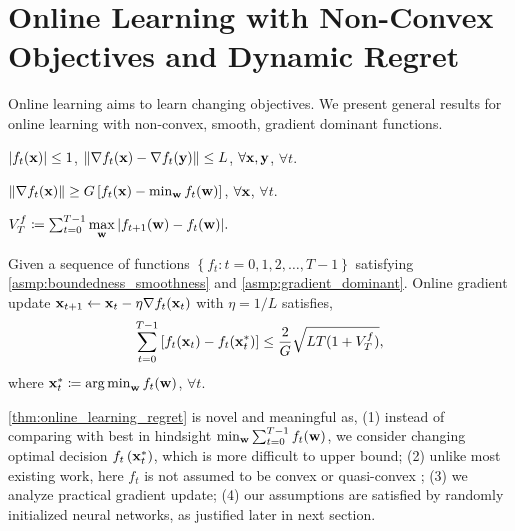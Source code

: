\section{Online Learning with Non-Convex Objectives and Dynamic Regret}

Online learning aims to learn changing objectives. We present general results for online learning with non-convex, smooth, gradient dominant functions.

\begin{asmp}
\label{asmp:boundedness_smoothness}
$\left| f_t({\mathbf{x}}) \right| \le 1$, $\left\| \nabla f_t({\mathbf{x}} ) - \nabla f_t({\mathbf{y}}) \right\| \le L $, $\forall {\mathbf{x}}, {\mathbf{y}}$, $\forall t$.
\end{asmp}

\begin{asmp}
\label{asmp:gradient_dominant}
$\left\| \nabla f_t({\mathbf{x}}) \right\| \ge G \left[ f_t({\mathbf{x}}) - \min_{{\mathbf{w}}}{ f_t({\mathbf{w}} )} \right]$, $\forall {\mathbf{x}}$, $\forall t$.
\end{asmp}

\begin{defi}
\label{defi:function_variation}
$V_{T}^{f} \coloneqq \sum_{t=0}^{T-1}{\max\limits_{{\mathbf{w}}}{\left| f_{t+1}({\mathbf{w}}) - f_{t}({\mathbf{w}}) \right| } }.$
\end{defi}

\begin{thm}
\label{thm:online_learning_regret}
Given a sequence of functions $\left\{ f_t : t = 0, 1, 2, \dots, T-1 \right\}$ satisfying \cref{asmp:boundedness_smoothness} and \cref{asmp:gradient_dominant}. Online gradient update ${\mathbf{x}}_{t+1} \gets {\mathbf{x}}_{t} - \eta \nabla f_{t}({\mathbf{x}}_{t})$ with $\eta = 1/L$ satisfies,
\begin{equation}
\label{eq:online_learning_regret}
\begin{split}
    \sum\limits_{t=0}^{T-1}{\left[ f_t({\mathbf{x}}_t) - f_t( {\mathbf{x}}_t^*) \right]} \le \frac{2}{G} \sqrt{L T ( 1 + V_T^f )},
\end{split}
\end{equation}
where ${\mathbf{x}}_t^* \coloneqq \operatorname*{arg\,min}_{{\mathbf{w}}}{f_t({\mathbf{w}})}$, $\forall t$.
\end{thm}

\cref{thm:online_learning_regret} is novel and meaningful as, (1) instead of comparing with best in hindsight $\min_{{\mathbf{w}}}{\sum_{t=0}^{T-1}{f_t({\mathbf{w}})} }$, we consider changing optimal decision $f_t\left( {\mathbf{x}}_t^* \right)$, which is more difficult to upper bound; (2) unlike most existing work, here $f_t$ is not assumed to be convex \citep{yang2016tracking} or quasi-convex \citep{gao2018online}; (3) we analyze practical gradient update; (4) our assumptions are  satisfied by randomly initialized neural networks, as justified later in next section.


